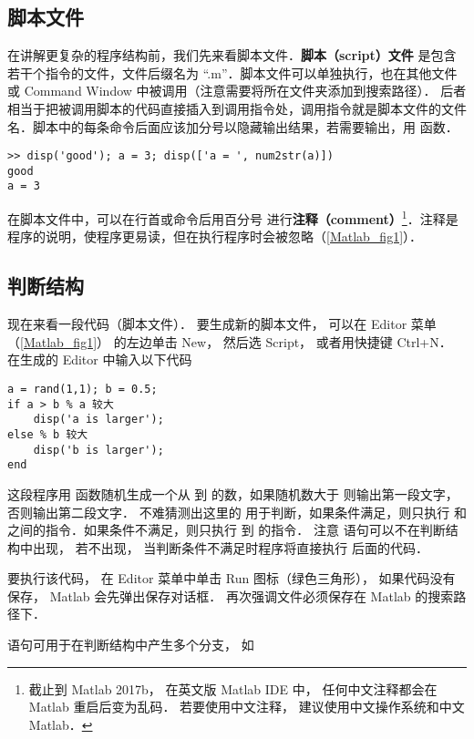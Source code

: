 

\subsection{脚本文件}
在讲解更复杂的程序结构前，我们先来看脚本文件．\textbf{脚本（script）文件} 是包含若干个指令的文件，文件后缀名为 “.m”．脚本文件可以单独执行，也在其他文件或 Command Window 中被调用（注意需要将所在文件夹添加到搜索路径）． 后者相当于把被调用脚本的代码直接插入到调用指令处，调用指令就是脚本文件的文件名．脚本中的每条命令后面应该加分号以隐藏输出结果，若需要输出，用  函数．
\begin{lstlisting}[language=MatlabCom]
>> disp('good'); a = 3; disp(['a = ', num2str(a)])
good
a = 3
\end{lstlisting}
在脚本文件中，可以在行首或命令后用百分号 \x{\%} 进行\textbf{注释（comment）}\footnote{截止到 Matlab 2017b， 在英文版 Matlab IDE 中， 任何中文注释都会在 Matlab 重启后变为乱码． 若要使用中文注释， 建议使用中文操作系统和中文 Matlab．}．注释是程序的说明，使程序更易读，但在执行程序时会被忽略（\autoref{Matlab_fig1}）．

\subsection{判断结构}
现在来看一段代码（脚本文件）． 要生成新的脚本文件， 可以在 Editor 菜单（\autoref{Matlab_fig1}） 的左边单击 New， 然后选 Script， 或者用快捷键 Ctrl+N． 在生成的 Editor 中输入以下代码

\begin{lstlisting}[language=MyMatlab]
a = rand(1,1); b = 0.5;
if a > b % a 较大
    disp('a is larger');
else % b 较大
    disp('b is larger');
end
\end{lstlisting}

这段程序用  函数随机生成一个从  到  的数，如果随机数大于  则输出第一段文字，否则输出第二段文字． 不难猜测出这里的  用于判断，如果条件满足，则只执行  和  之间的指令．如果条件不满足，则只执行  到  的指令． 注意  语句可以不在判断结构中出现， 若不出现， 当判断条件不满足时程序将直接执行  后面的代码．

要执行该代码， 在 Editor 菜单中单击 Run 图标（绿色三角形）， 如果代码没有保存， Matlab 会先弹出保存对话框． 再次强调文件必须保存在 Matlab 的搜索路径下．

 语句可用于在判断结构中产生多个分支， 如

